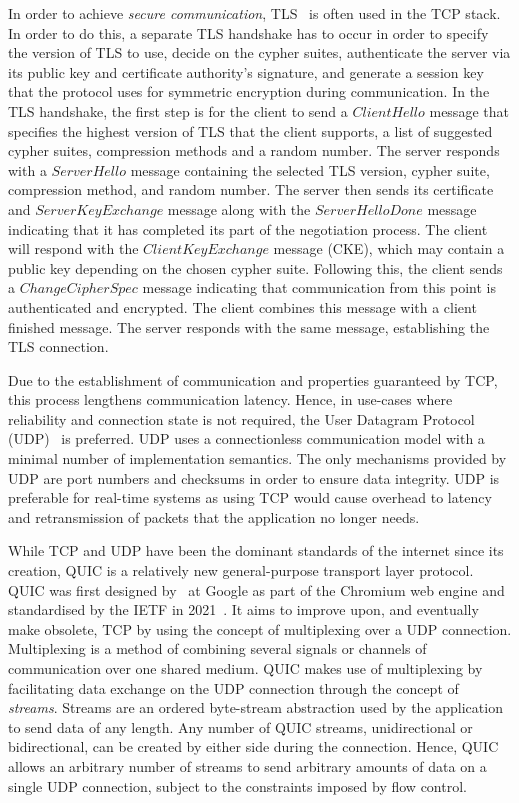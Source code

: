 In order to achieve \textit{secure communication}, TLS~\citep{rescorla_transport_2018} is often used in the TCP stack.
In order to do this, a separate TLS handshake has to occur in order to specify the version of TLS to use, decide on the cypher suites, authenticate the server via its public key and certificate authority's signature, and generate a session key that the protocol uses for symmetric encryption during communication.
In the TLS handshake, the first step is for the client to send a $ClientHello$ message that specifies the highest version of TLS that the client supports, a list of suggested cypher suites, compression methods and a random number.
The server responds with a $ServerHello$ message containing the selected TLS version, cypher suite, compression method, and random number.
The server then sends its certificate and $ServerKeyExchange$ message along with the $ServerHelloDone$ message indicating that it has completed its part of the negotiation process.
The client will respond with the $ClientKeyExchange$ message (CKE), which may contain a public key depending on the chosen cypher suite.
Following this, the client sends a $ChangeCipherSpec$ message indicating that communication from this point is authenticated and encrypted.
The client combines this message with a client finished message.
The server responds with the same message, establishing the TLS connection.

Due to the establishment of communication and properties guaranteed by TCP, this process lengthens communication latency.
Hence, in use-cases where reliability and connection state is not required, the User Datagram Protocol (UDP)~\citep{j_postel_1980} is preferred.
UDP uses a connectionless communication model with a minimal number of implementation semantics.
The only mechanisms provided by UDP are port numbers and checksums in order to ensure data integrity.
UDP is preferable for real-time systems as using TCP would cause overhead to latency and retransmission of packets that the application no longer needs.

While TCP and UDP have been the dominant standards of the internet since its creation, QUIC is a relatively new general-purpose transport layer protocol. QUIC was first designed by~\citet{jim_roskind_2012} at Google as part of the Chromium web engine and standardised by the IETF in 2021~\citep{iyengar_quic_2021}.
It aims to improve upon, and eventually make obsolete, TCP by using the concept of multiplexing over a UDP connection.
Multiplexing is a method of combining several signals or channels of communication over one shared medium.
QUIC makes use of multiplexing by facilitating data exchange on the UDP connection through the concept of \textit{streams}.
Streams are an ordered byte-stream abstraction used by the application to send data of any length.
Any number of QUIC streams, unidirectional or bidirectional, can be created by either side during the connection.
Hence, QUIC allows an arbitrary number of streams to send arbitrary amounts of data on a single UDP connection, subject to the constraints imposed by flow control.

